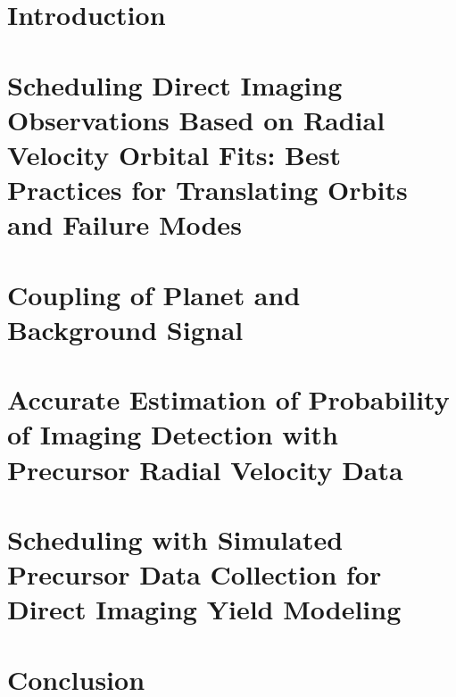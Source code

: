 \documentclass[phd,tocprelim]{cornell}
\begin{document}
\chapter{Introduction}
\label{cha:intro}


\chapter{Scheduling Direct Imaging Observations Based on Radial Velocity Orbital Fits: Best Practices for Translating Orbits and Failure Modes}
\label{cha:first_paper}


\chapter{Coupling of Planet and Background Signal}
\label{cha:coupling}


\chapter{Accurate Estimation of Probability of Imaging Detection with Precursor Radial Velocity Data}
\label{cha:accurate_pdet}


\chapter{Scheduling with Simulated Precursor Data Collection for Direct Imaging Yield Modeling}
\label{cha:sim_and_scheduling}


\chapter{Conclusion}
\label{cha:conclusion}



\appendix


\end{document}
